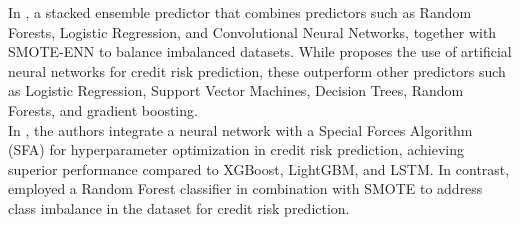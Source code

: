 {    %
    In \cite{aruleba2025improved}, a stacked ensemble predictor that combines predictors such as Random Forests, Logistic Regression, and Convolutional Neural Networks, together with SMOTE-ENN \cite{batista2004study} to balance imbalanced datasets. While \cite{oliveira2025advancing} proposes the use of artificial neural networks for credit risk prediction, these outperform other predictors such as Logistic Regression, Support Vector Machines, Decision Trees, Random Forests, and gradient boosting.\\ 

    In \cite{lin2025deep}, the authors integrate a neural network with a Special Forces Algorithm (SFA) for hyperparameter optimization in credit risk prediction, achieving superior performance compared to XGBoost, LightGBM, and LSTM. In contrast, \cite{sundaravadivel2025optimizing} employed a Random Forest classifier in combination with SMOTE \cite{chawla2002smote} to address class imbalance in the dataset for credit risk prediction.\\

}
